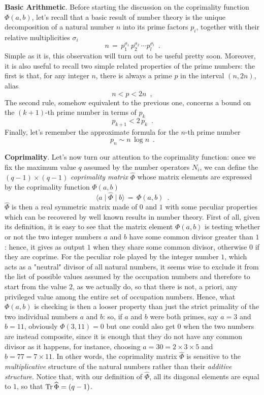 \documentclass[aps,pra,superscriptaddress]{revtex4}
\newcommand\be            {\begin{equation}}
\newcommand\ee            {\end{equation}}
\renewcommand{\(}{\left(}
\renewcommand{\)}{\right)}
\renewcommand{\[}{\left[}
\renewcommand{\]}{\right]}
\begin{document}
\vspace{3mm}
\noindent
{\bf Basic Arithmetic}. 
Before starting the discussion on the coprimality function $\Phi(a,b)$, let's recall that a basic result of number theory is the unique decomposition of 
a natural number $n$ into its prime factors $p_i$, together with their relative multiplicities $\sigma_i$ 
\be 
n \, =\, p_1^{\sigma_1} \, p_2^{\sigma_2} \, \cdots p_l^{\sigma_l} 
\label{primedecomposition}
\,\,\,.
\ee
Simple as it is, this observation will turn out to be useful pretty soon. Moreover, it is also useful to recall two simple related properties of the prime numbers: 
the first is that, for any integer $n$, there is always a prime $p$ in the interval $(n, 2n)$, alias 
\be 
n < p < 2n \,\,\,,
\label{doppio}
\ee 
The second rule, somehow equivalent to the previous one, concerns a bound on the $(k+1)$-th prime number in terms of $p_k$
\be
p_{k+1} < 2 \,p_k \,\,\,.
\label{twiceprime}
\ee
Finally, let's remember the approximate formula for the $n$-th prime number 
\be 
p_n \sim n \, \log n\,\,\,.
\label{approximateprime}
\ee
 
\vspace{3mm}
\noindent
{\bf Coprimality}. 
Let's now turn our attention to the coprimality function: once we fix the maximum value $q$ assumed by the number operators $N_i$, 
we can define the $(q-1) \times (q-1)$ {\em coprimality matrix} $\widehat\Phi$ whose matrix elements are expressed by the coprimality function $\Phi(a,b)$
\be 
\langle a \mid \widehat\Phi \mid b \rangle \,=\, \Phi(a,b) \,\,\,.
\label{coprimalitymatrix}
\ee
$\widehat\Phi$ is then a real symmetric matrix made of $0$ and $1$ with some peculiar properties which can be recovered by well known results in number theory. First of all, given its definition, it is easy to see that the matrix element $\Phi(a,b)$ is testing whether or not the two integer numbers $a$ and $b$ have some common divisor greater than $1$: hence, it gives as output $1$ when they share some common divisor, otherwise $0$ if they are coprime. For the peculiar role played by the integer number $1$, which acts as a "neutral" divisor of all natural numbers, it seems wise to exclude it from the list of possible values assumed by the occupation numbers and therefore to start from the value $2$, as we actually do, so that there is not, a priori, any privileged value among the entire set of occupation numbers. Hence, what $\Phi(a,b)$ is checking is then a looser property than just the strict primality of the two individual numbers $a$ and $b$: so, if $a$ and $b$ were both primes, say $a = 3$ and $b=11$, obviously $\Phi(3,11) =0$ but one could also get $0$ when the two numbers are instead composite, since it is enough that they do not have any common divisor as it happens, for instance, choosing $a = 30 = 2 \times 3\times 5$ and $b = 77 = 7 \times 11$. In other words, the coprimality matrix $\widehat\Phi$ is sensitive to the {\em multiplicative} structure of the natural numbers rather than their {\em additive structure}. Notice that, with our definition of $\widehat\Phi$, all its diagonal elements are equal to $1$, so that ${\rm Tr}\, \widehat\Phi = (q-1) $. 
\end{document}
